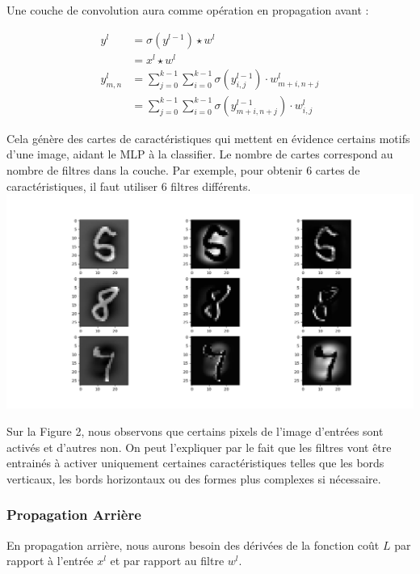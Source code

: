\begin{multicols}{2}
Une couche de convolution aura comme opération
en propagation avant : 

\begin{align}
y^{l} &= \sigma (y^{l-1})\star w^{l} \\
&=x^{l}\star w^{l} \\
y_{m,n}^{l} &= \sum_{j=0}^{k-1}\sum_{i=0}^{k-1}\sigma(y_{i,j}^{l-1}) \cdot w_{m+i,n+j}^{l}\\
&= \sum_{j=0}^{k-1}\sum_{i=0}^{k-1}\sigma(y_{m+i, n+j}^{l-1}) \cdot w_{i,j}^{l}
\end{align}

Cela génère des cartes de caractéristiques qui mettent en évidence certains 
motifs d’une image, aidant le MLP à la classifier. Le nombre de cartes 
correspond au nombre de filtres dans la couche. Par exemple, pour obtenir 6 cartes 
de caractéristiques, il faut utiliser 6 filtres différents.\\

\includegraphics[width=\columnwidth]{images/featuremaps.png}
\hfill\break

Sur la Figure 2, nous observons que certains pixels de l'image d'entrées sont
activés et d'autres non. On peut l'expliquer par le fait que les filtres 
vont être entrainés à activer uniquement certaines caractéristiques telles
que les bords verticaux, les bords horizontaux ou des formes plus complexes si nécessaire.\\


\subsubsection{Propagation Arrière}

En propagation arrière, nous aurons besoin des dérivées de la fonction coût $L$
par rapport à l'entrée $x^{l}$ et par rapport au filtre $w^{l}$.\\


\end{multicols}
